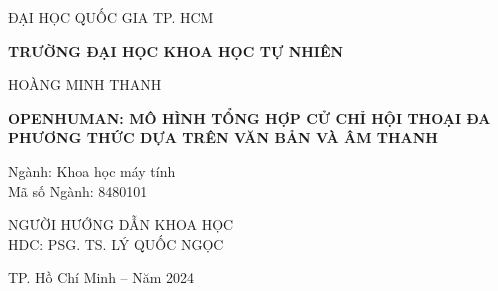 \begin{titlepage}

\begin{mdframed}[linewidth=1pt, 
	linecolor=black, 
	innerleftmargin=10mm, 
	innerrightmargin=10mm, 
	innertopmargin=10mm, 
	innerbottommargin=10mm]
	\centering
	\vspace*{1cm}
	
	{ ĐẠI HỌC QUỐC GIA TP. HCM\par}
	\vspace{0.25cm}
	\textbf{TRƯỜNG ĐẠI HỌC KHOA HỌC TỰ NHIÊN}\\
	
	\vspace{2cm}
	
	\large HOÀNG MINH THANH \\
	
	\vspace{2cm}
	
	\Large \textbf{\MakeUppercase{OPENHUMAN: MÔ HÌNH TỔNG HỢP CỬ CHỈ HỘI THOẠI ĐA PHƯƠNG THỨC DỰA TRÊN VĂN BẢN VÀ ÂM THANH}}\\
	
	\vspace{1cm}
	
	\flushleft
	{\normalsize Ngành: Khoa học máy tính}\\
	{ \normalsize Mã số Ngành: 8480101}\\
	
	\vspace{2cm}
	
	\centering
	{\normalsize NGƯỜI HƯỚNG DẪN KHOA HỌC } \\ 
	{\normalsize HDC: PSG. TS. LÝ QUỐC NGỌC} \\
	
	\vfill
	\vspace{3cm}
	
	{\small TP. Hồ Chí Minh – Năm 2024}
\end{mdframed}
\end{titlepage}



\pagebreak
{}


\pagebreak
